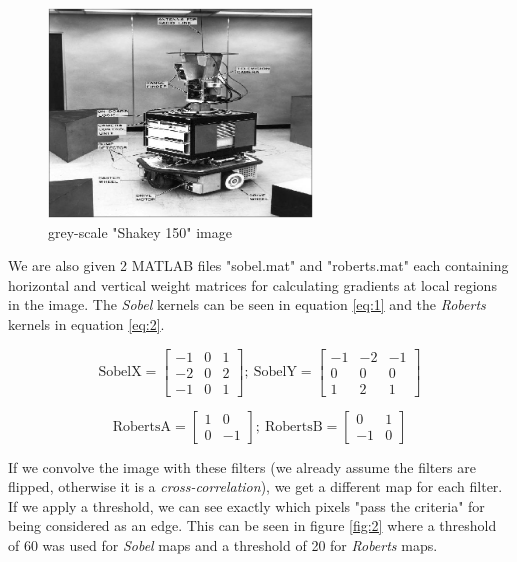 \documentclass[lettersize,journal]{IEEEtran}
\begin{document}
\begin{figure}[h]
    \centering
    \includegraphics[height=15em]{figures/shakey150.jpg}
    \caption{grey-scale "Shakey 150" image}
    \label{fig:1}
\end{figure}

We are also given 2 MATLAB files "sobel.mat" and "roberts.mat" each containing horizontal and vertical weight matrices for calculating gradients at local regions in the image. The \emph{Sobel} kernels can be seen in equation \ref{eq:1} and the \emph{Roberts} kernels in equation \ref{eq:2}.

\begin{equation}
    \label{eq:1}
    \text{SobelX} = \begin{bmatrix} -1 & 0 & 1 \\ -2 & 0 & 2 \\ -1 & 0 & 1 \end{bmatrix};\ 
    \text{SobelY} = \begin{bmatrix} -1 & -2 & -1 \\ 0 & 0 & 0 \\ 1 & 2 & 1 \end{bmatrix}
\end{equation}

\begin{equation}
    \label{eq:2}
    \text{RobertsA} = \begin{bmatrix} 1 & 0 \\ 0 & -1 \end{bmatrix};\ 
    \text{RobertsB} = \begin{bmatrix} 0 & 1 \\ -1 & 0 \end{bmatrix}
\end{equation}

If we convolve the image with these filters (we already assume the filters are flipped, otherwise it is a \emph{cross-correlation}), we get a different map for each filter. If we apply a threshold, we can see exactly which pixels "pass the criteria" for being considered as an edge. This can be seen in figure \ref{fig:2} where a threshold of 60 was used for \emph{Sobel} maps and a threshold of 20 for \emph{Roberts} maps.
\end{document}
